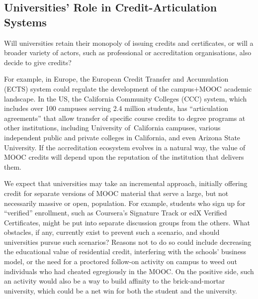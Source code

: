 
\subsection{Universities' Role in Credit-Articulation Systems}

Will  universities retain their monopoly
of issuing credits and certificates, or will a broader variety of actors,
such as professional or accreditation organisations, 
also decide to give credits?  

For example, in Europe, the European Credit Transfer and Accumulation
(ECTS) system could regulate the
development of the campus$+$MOOC academic landscape.  In the US, the
California Community Colleges (CCC) system, which includes over 100 campuses
serving 2.4 million students, has ``articulation agreements'' that allow
transfer of specific course credits to degree programs at other institutions,
including University of~California campuses, various independent public
and private colleges in California, and even Arizona State University.
If the accreditation ecosystem evolves in a natural
way, the value of MOOC credits will depend upon the reputation of the
institution that delivers them.

We expect that universities may take an
incremental approach, initially offering
credit for separate versions of MOOC material that serve a large, but
not necessarily massive or open, population.
For example, students who sign up for ``verified''
enrollment, such as Coursera's Signature Track or edX Verified
Certificates, might be put
into separate discussion groups from the others.  
What obstacles, if any, currently exist to prevent such a scenario, and
should universities pursue such scenarios?
Reasons not to do so could include decreasing the educational value of
residential credit, interfering with the schools' business model, or the
need for a proctored follow-on activity on campus to
weed out individuals who had cheated egregiously in the MOOC.  On the
positive side, such an activity would also be a way to build affinity to
the brick-and-mortar university, which could be a net win for both the
student and the university.
 


